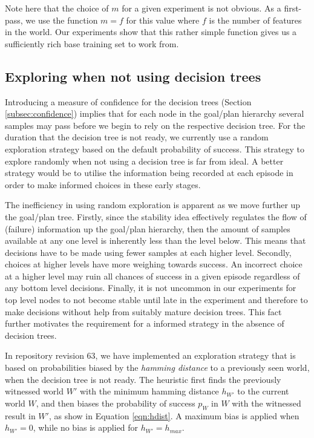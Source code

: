 \documentclass[a4paper]{article}
\newcommand{\dt}{{decision tree}\xspace}
\begin{document}
Note here that the choice of $m$ for a given experiment is not obvious. As a first-pass, we use the function $m=f$ for this value where $f$ is the number of features in the world. Our experiments show that this rather simple function gives us a sufficiently rich base training set to work from. 

\subsection{Exploring when not using {\dt}s}
\label{subsec:hamming}

Introducing a measure of confidence for the {\dt}s (Section \ref{subsec:confidence}) implies that for each node in the goal/plan hierarchy several samples may pass before we begin to rely on the respective \dt. For the duration that the \dt is not ready, we currently use a random exploration strategy based on the default probability of success. This strategy to explore randomly when not using a \dt is far from ideal. A better strategy would be to utilise the information being recorded at each episode in order to make informed choices in these early stages. 

The inefficiency in using random exploration is apparent as we move further up the goal/plan tree. Firstly, since the stability idea effectively regulates the flow of (failure) information up the goal/plan hierarchy, then the amount of samples available at any one level is inherently less than the level below. This means that decisions have to be made using fewer samples at each higher level. Secondly, choices at higher levels have more weighing towards success. An incorrect choice at a higher level may ruin all chances of success in a given episode regardless of any bottom level decisions. Finally, it is not uncommon in our experiments for top level nodes to not become stable until late in the experiment and therefore to make decisions without help from suitably mature {\dt}s. This fact further motivates the requirement for a informed strategy in the absence of {\dt}s.

In repository revision 63, we have implemented an exploration strategy that is based on probabilities biased by the \textit{hamming distance} to a previously seen world, when the decision tree is not ready. The heuristic first finds the previously witnessed world $W'$ with the minimum hamming distance $h_{W'}$ to the current world $W$, and then biases the probability of success $p_W$ in $W$ with the witnessed result in $W'$, as show in Equation \ref{eqn:hdist}. A maximum bias is applied when $h_{W'}=0$, while no bias is applied for  $h_{W'}=h_{max}$.
\end{document}
